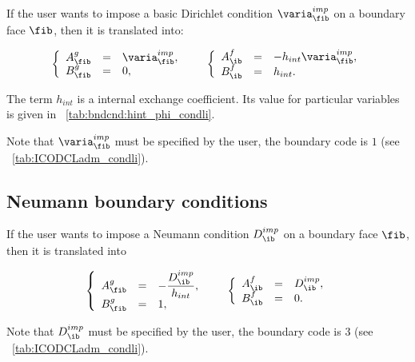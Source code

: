 If the user wants to impose a basic Dirichlet condition $\varia^{imp}_\fib$ on a boundary face $\fib$,
then it is translated into:

\begin{equation}
\begin{array}{r c l}
\left\lbrace
\begin{array}{r c l}
A^g_\fib & = &\varia^{imp}_\fib , \\
B^g_\fib & = & 0,
\end{array}
\right.
 & &
\left\lbrace
\begin{array}{r c l}
A^f_\ib & = & -h_{int} \varia^{imp}_\fib, \\
B^f_\ib & = & h_{int}.
\end{array}
\right.
\end{array}
\end{equation}

The term $h_{int}$ is a internal exchange coefficient. Its value for particular variables is 
given in \tablename~\ref{tab:bndcnd:hint_phi_condli}.

\begin{remark}
Note that $\varia^{imp}_\fib$ must be specified by the user, the boundary code is $1$ (see \tablename~\ref{tab:ICODCLadm_condli}).
\end{remark}


\subsection{Neumann boundary conditions}

If the user wants to impose a Neumann condition $D^{imp}_\ib$ on a boundary face $\fib$,
then it is translated into

\begin{equation}
\begin{array}{r c l}
\left\lbrace
\begin{array}{r c l}
A^g_\fib & = & - \dfrac{D^{imp}_\ib}{h_{int}} ,\\
B^g_\fib & = & 1,
\end{array}
\right.
& &
\left\lbrace
\begin{array}{r c l}
A^f_\ib & = & D^{imp}_\ib ,\\
B^f_\ib & = & 0 .
\end{array}
\right.
\end{array}
\end{equation}

\begin{remark}
Note that  $D^{imp}_\ib$ must be specified by the user, the boundary code is $3$ (see \tablename~\ref{tab:ICODCLadm_condli}).
\end{remark}

